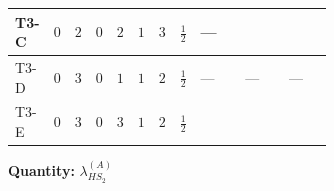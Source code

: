 \documentclass[8pt]{article}
\begin{document}
\begin{landscape}
\begin{longtable}{@{}llcccccc >{\raggedright\arraybackslash}p{0.21\linewidth} >{\raggedright\arraybackslash}p{0.21\linewidth} >{\raggedright\arraybackslash}p{0.21\linewidth}@{}}
\midrule
T3-C & $0$ & $2$ & $0$ & $2$ & $1$ & $3$ & $\frac{1}{2}$ & --- & \scriptsize\adjustbox{max width=\linewidth}{$\begin{gathered} +2 {\lambda_1} {\lambda_{HS_2}^{(A)}}\end{gathered}$} & \scriptsize\adjustbox{max width=\linewidth}{$\begin{gathered} +8 {\lambda_{HS_2}^{(1)}} {\lambda_{HS_2}^{(A)}}\end{gathered}$} \\
\midrule
T3-D & $0$ & $3$ & $0$ & $1$ & $1$ & $2$ & $\frac{1}{2}$ & --- & --- & --- \\
\midrule
T3-E & $0$ & $3$ & $0$ & $3$ & $1$ & $2$ & $\frac{1}{2}$ & \scriptsize\adjustbox{max width=\linewidth}{$\begin{gathered} -\frac{33 {g_2}^2 {\lambda_{HS_2}^{(A)}}}{2}\end{gathered}$} & \scriptsize\adjustbox{max width=\linewidth}{$\begin{gathered} +2 {\lambda_1} {\lambda_{HS_2}^{(A)}}\end{gathered}$} & \scriptsize\adjustbox{max width=\linewidth}{$\begin{gathered} +8 {\lambda_{HS_2}^{(1)}} {\lambda_{HS_2}^{(A)}}\end{gathered}$} \\
\midrule
\bottomrule
\end{longtable}
\clearpage
\noindent\textbf{Quantity: }$\lambda_{HS_2}^{(A)}$\par\smallskip

\end{landscape}
\end{document}
